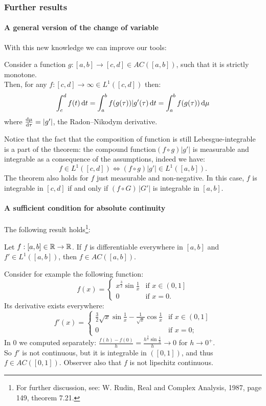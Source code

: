 \subsubsection{Further results}

\paragraph{A general version of the change of variable} With this new knowledge we can improve our tools:
\begin{theo}
	Consider a function $g:[a,b]\to [c,d] \in AC([a,b])$, such that it is strictly monotone.\\
	Then, for any $f:[c,d] \to \infty \in L^1([c,d])$ then:
	$$\int_c^d f(t) \, \mathrm d t =  \int_a^b f(g(\tau))|g'(\tau) \,\mathrm d t = \int_a^b f(g(\tau))\,\mathrm d \mu$$
	where $\frac{\mathrm d \mu}{\mathrm d \tau} = |g'|$, the Radon--Nikodym derivative.
\end{theo}

Notice that the fact that the composition of function is still Lebesgue-integrable is a part of the theorem: the compound function$(f\circ g)|g'|$ is measurable and integrable as a consequence of the assumptions, indeed we have:
$$f \in L^1([c,d]) \iff (f\circ g)|g'|\in L^1([a,b]).$$
The theorem also holds for $f$ just measurable and non-negative. In this case, $f$ is integrable in $[c,d]$ if and only if $(f\circ G) \, |G'|$ is integrable in $[a,b]$.


\paragraph{A sufficient condition for absolute continuity} The following result holds\footnote{For further discussion, see: W. Rudin, Real and Complex Analysis, 1987, page 149, theorem 7.21.}:
\begin{theo}
	Let $f:[a,b]\in\mathbb R \to \mathbb R$. If $f$ is differentiable everywhere in $[a,b]$ and $f' \in L^1([a,b])$, then $f \in AC([a,b])$.
\end{theo}

Consider for example the following function:
$$f(x) = \begin{cases}
x^{\frac 3 2} \sin \frac 1 x & \text{if }x \in \left(0,1\right]\\
0& \text{if }x=0.
\end{cases}$$
Its derivative exists everywhere:
$$f'(x)= \begin{cases}
\frac 3 2 \sqrt x \sin \frac 1 x - \frac {1}{\sqrt{x}} \cos \frac 1 x & \text{if }x\in\left(0,1\right] \\
0 & \text{if }x=0;
\end{cases}$$
In $0$ we computed separately: $\frac{f(h)-f(0)}{h} = \frac{h^{\frac 3 2 } \sin \frac 1 h }{h} \to 0$ for $h \to 0^+$.\\
So $f'$ is not continuous, but it is integrable in $([0,1])$, and thus $f \in AC([0,1])$. Observer also that $f$ is not lipschitz continuous.

